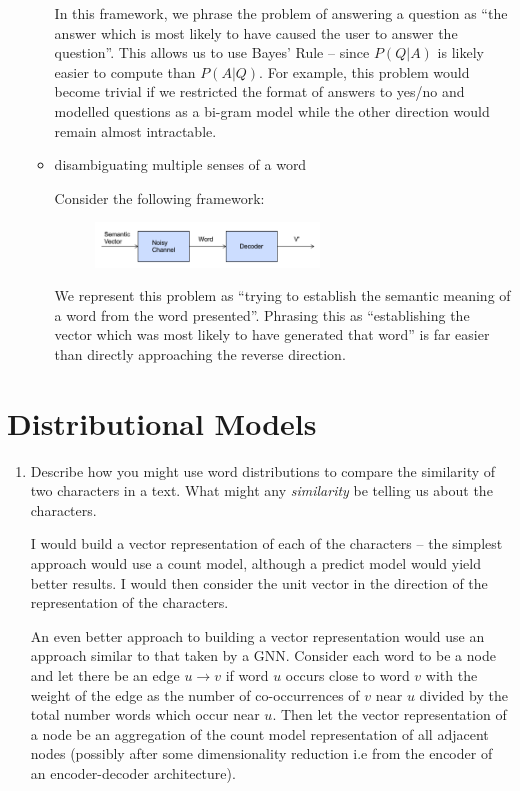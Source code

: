 \documentclass[10pt,\jkfside,a4paper]{article}
\begin{document}
\begin{enumerate}
\begin{itemize}[label = -]
In this framework, we phrase the problem of answering a question as ``the
answer which is most likely to have caused the user to answer the question''.
This allows us to use Bayes' Rule -- since $P(Q|A)$ is likely easier to
compute than $P(A|Q)$. For example, this problem would become trivial if we
restricted the format of answers to yes/no and modelled questions as a
bi-gram model while the other direction would remain almost intractable.

\item disambiguating multiple senses of a word

Consider the following framework:

\begin{figure}[H]
\centering
\includegraphics[width=0.6\textwidth]{meaningchannel}
\end{figure}

We represent this problem as ``trying to establish the semantic meaning of a
word from the word presented''. Phrasing this as ``establishing the vector
which was most likely to have generated that word'' is far easier than
directly approaching the reverse direction.

\end{itemize}

\end{enumerate}

\section{Distributional Models}

\begin{enumerate}

\item Describe how you might use word distributions to compare the
similarity of two characters in a text. What might any \textit{similarity}
be telling us about the characters.

I would build a vector representation of each of the characters -- the
simplest approach would use a count model, although a predict model would
yield better results. I would then consider the unit vector in the direction
of the representation of the characters.

An even better approach to building a vector representation would use an
approach similar to that taken by a GNN\@. Consider each word to be a node
and let there be an edge $u \to v$ if word $u$ occurs close to word $v$ with
the weight of the edge as the number of co-occurrences of $v$ near $u$ divided
by the total number words which occur near $u$. Then let the vector
representation of a node be an aggregation of the count model representation
of all adjacent nodes (possibly after some dimensionality reduction i.e from
the encoder of an encoder-decoder architecture).

\end{enumerate}
\end{document}
